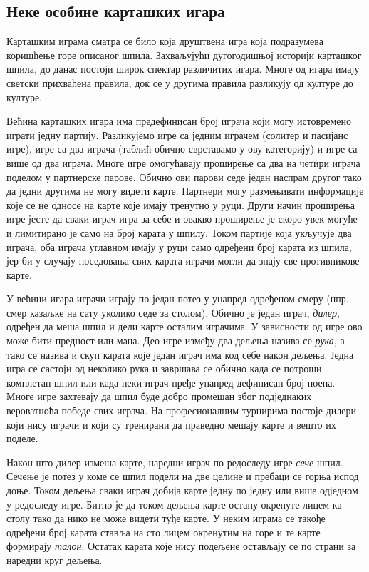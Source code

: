 \documentclass[a4paper, 12pt, ngerman]{article}
\let\oldsubsection\subsection
\renewcommand\subsection{\clearpage\oldsubsection}
\begin{document}
\subsection{Неке особине карташких игара}
Карташким играма сматра се било која друштвена игра која подразумева коришћење горе описаног шпила. Захваљујући дугогодишњој историји карташког шпила, до данас постоји широк спектар различитих игара. Многе од игара имају светски прихваћена правила, док се у другима правила разликују од културе до културе.

Већина карташких игара има предефинисан број играча који могу истовремено играти једну партију. Разликујемо игре са једним играчем (солитер и пасијанс игре), игре са два играча (таблић обично сврставамо у ову категорију) и игре са више од два играча. Многе игре омогућавају проширење са два на четири играча поделом у партнерске парове. Обично ови парови седе један наспрам другог тако да једни другима не могу видети карте. Партнери могу размењивати информације које се не односе на карте које имају тренутно у руци. Други начин проширења игре јесте да сваки играч игра за себе и овакво проширење је скоро увек могуће и лимитирано је само на број карата у шпилу. Током партије која укључује два играча, оба играча углавном имају у руци само одређени број карата из шпила, јер би у случају поседовања свих карата играчи могли да знају све противникове карте. 

У већини игара играчи играју по један потез у унапред одређеном смеру (нпр. смер казаљке на сату уколико седе за столом). Обично је један играч, \textit{дилер}, одређен да меша шпил и дели карте осталим играчима. У зависности од игре ово може бити предност или мана. Део игре између два дељења назива се \textit{рука}, а тако се назива и скуп карата које један играч има код себе након дељења. Једна игра се састоји од неколико рука и завршава се обично када се потроши комплетан шпил или када неки играч пређе унапред дефинисан број поена. Многе игре захтевају да шпил буде добро промешан због подједнаких вероватноћа победе свих играча. На професионалним турнирима постоје дилери који нису играчи и који су тренирани да праведно мешају карте и вешто их поделе.

Након што дилер измеша карте, наредни играч по редоследу игре \textit{сече} шпил. Сечење је потез у коме се шпил подели на две целине и пребаци се горња испод доње. Током дељења сваки играч добија карте једну по једну или више одједном у редоследу игре. Битно је да током дељења карте остану окренуте лицем ка столу тако да нико не може видети туђе карте. У неким играма се такође одређени број карата ставља на сто лицем окренутим на горе и те карте формирају \textit{талон}. Остатак карата које нису подељене остављају се по страни за наредни круг дељења.
\end{document}
